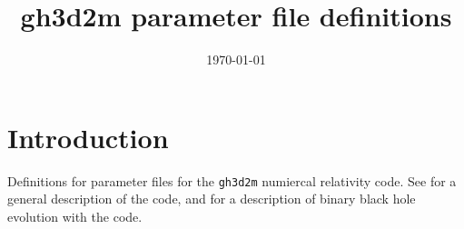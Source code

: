 \documentclass{article}
\title{gh3d2m parameter file definitions}
\author{}
\date{\today}
\begin{document}
 
\maketitle
 
\section*{Introduction}
 
Definitions for parameter files for the \texttt{gh3d2m}
numiercal relativity code.
See \cite{Pretorius:2004jg} for a general description of the code,
and \cite{Pretorius:2006tp} for a description of binary black hole
evolution with the code.

\newpage
\end{document}
